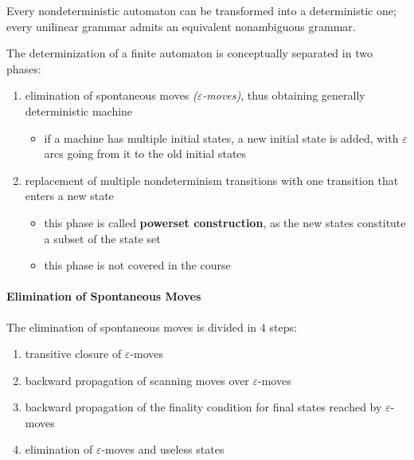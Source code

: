 \documentclass[english]{article}
\begin{document}
\begin{property}
  Every nondeterministic automaton can be transformed into a deterministic one;
  every unilinear grammar admits an equivalent nonambiguous grammar.
\end{property}

The determinization of a finite automaton is conceptually separated in two phases:

\begin{enumerate}
  \item elimination of spontaneous moves \textit{(\(\varepsilon\)-moves)}, thus obtaining generally deterministic machine
        \begin{itemize}[label=\(\rightarrow\)]
          \item if a machine has multiple initial states, a new initial state is added, with \(\varepsilon\) arcs going from it to the old initial states
        \end{itemize}
  \item replacement of multiple nondeterminism transitions with one transition that enters a new state
        \begin{itemize}[label=\(\rightarrow\)]
          \item this phase is called \textbf{powerset construction}, as the new states constitute a subset of the state set
          \item this phase is not covered in the course
        \end{itemize}
\end{enumerate}

\paragraph{Elimination of Spontaneous Moves}

The elimination of spontaneous moves is divided in \(4\) steps:

\begin{enumerate}
  \item transitive closure of \(\varepsilon\)-moves
        \begin{figure}[h]
          \centering
          
        \end{figure}
  \item backward propagation of scanning moves over \(\varepsilon\)-moves
        \begin{figure}[h]
          \centering
          
        \end{figure}
  \item backward propagation of the finality condition for final states reached by \(\varepsilon\)-moves
        \begin{figure}[h]
          \centering
          
        \end{figure}
  \item elimination of \(\varepsilon\)-moves and useless states
\end{enumerate}
\end{document}
